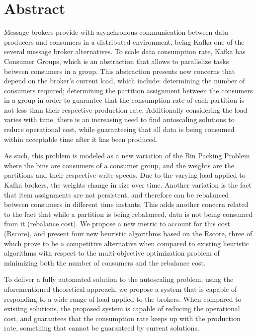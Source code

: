 \chapter*{Abstract}

Message brokers provide with asynchronous communication between data producers
and consumers in a distributed environment, being Kafka one of the several
message broker alternatives. To scale data consumption rate, Kafka has Consumer
Groups, which is an abstraction that allows to parallelize tasks between
consumers in a group. This abstraction presents new concerns that depend on the
broker's current load, which include: determining the number of consumers
required; determining the partition assignment between the consumers in a group
in order to guarantee that the consumption rate of each partition is not less
than their respective production rate. Additionally considering the load varies
with time, there is an increasing need to find autoscaling solutions to reduce
operational cost, while guaranteeing that all data is being consumed within
acceptable time after it has been produced.

As such, this problem is modeled as a new variation of the Bin Packing Problem
where the bins are consumers of a consumer group, and the weights are the
partitions and their respective write speeds. Due to the varying load applied to
Kafka brokers, the weights change in size over time. Another variation is the
fact that item assignments are not persistent, and therefore can be rebalanced
between consumers in different time instants. This adds another concern related
to the fact that while a partition is being rebalanced, data is not being
consumed from it (rebalance cost). We propose a new metric to account for this
cost (Rscore), and present four new heuristic algorithms based on the Rscore,
three of which prove to be a competitive alternative when compared to existing
heuristic algorithms with respect to the multi-objective optimization problem of
minimizing both the number of consumers and the rebalance cost.

To deliver a fully automated solution to the autoscaling problem, using the
aforementioned theoretical approach, we propose a system that is capable of
responding to a wide range of load applied to the brokers. When compared to
exisitng solutions, the proposed system is capable of reducing the operational
cost, and guarantees that the consumption rate keeps up with the production
rate, something that cannot be guaranteed by current solutions. 

